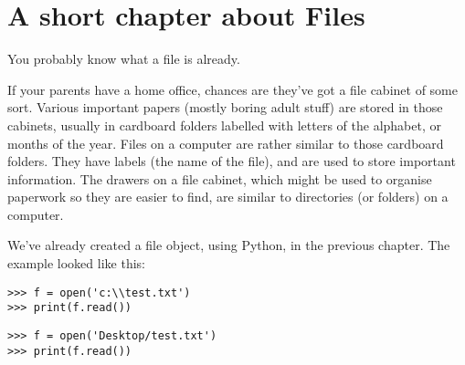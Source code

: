 

\chapter{A short chapter about Files}\label{ch:ashortchapteraboutfiles}

You probably know what a file is already.
\par
\noindent
If your parents have a home office, chances are they've got a file cabinet of some sort.  Various important papers (mostly boring adult stuff) are stored in those cabinets, usually in cardboard folders labelled with letters of the alphabet, or months of the year. Files on a computer are rather similar to those cardboard folders. They have labels (the name of the file), and are used to store important information. The drawers on a file cabinet, which might be used to organise paperwork so they are easier to find, are similar to directories (or folders) on a computer.
\par
We've already created a file object, using Python, in the previous chapter.  The example looked like this:

\begin{WINDOWS}

\begin{listing}
\begin{verbatim}
>>> f = open('c:\\test.txt')
>>> print(f.read())
\end{verbatim}
\end{listing}

\end{WINDOWS}

\begin{MAC}

\begin{listing}
\begin{verbatim}
>>> f = open('Desktop/test.txt')
>>> print(f.read())
\end{verbatim}
\end{listing}

\end{MAC}

